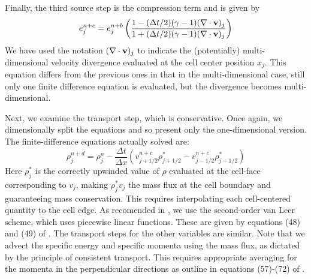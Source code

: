 Finally, the third source step is the compression term and is given by
\begin{equation}
e^{n+c}_j = e^{n+b}_j \left( \frac{1 - (\Delta t/2) (\gamma - 1) (\nabla \cdot \vecv)_j }
                           {1 + (\Delta t/2) (\gamma - 1) (\nabla \cdot \vecv)_j } \right)
\end{equation}
We have used the notation $(\nabla \cdot \mathbf{v})_j$ to indicate the (potentially) multi-dimensional velocity divergence evaluated at the cell center position $x_j$.  This equation differs from the previous ones in that in the multi-dimensional case, still only one finite difference equation is evaluated, but the divergence becomes multi-dimensional.

Next, we examine the transport step, which is conservative.  Once again, we dimensionally split the equations and so present only the one-dimensional version.  The finite-difference equations actually solved are:
\begin{equation}
\rho_j^{n+d} = \rho_j^{n} - \frac{\Delta t}{\Delta x} (v^{n+c}_{j+1/2} \rho^{*}_{j+1/2} - v^{n+c}_{j-1/2} \rho^{*}_{j-1/2} )
\end{equation}
Here $\rho^*_j$ is the correctly upwinded value of $\rho$ evaluated at the cell-face corresponding to $v_j$, making $\rho^*_j v_j$ the mass flux at the cell boundary and guaranteeing mass conservation.   This requires interpolating each cell-centered quantity to the cell edge.  As recomended in \citet{Stone92a}, we use the second-order van Leer scheme, which uses piecewise linear functions.  These are given by equations (48) and (49) of \citet{Stone92a}.  The transport steps for the other variables are similar.  Note that we advect the specific energy and specific momenta using the mass flux, as dictated by the principle of consistent transport.  This requires appropriate averaging for the momenta in the perpendicular directions as outline in equations (57)-(72) of \citet{Stone92a}.



